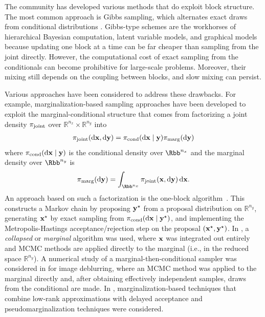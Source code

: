 \documentclass[onefignum,onetabnum]{siamonline250211}
\renewcommand{\d} {{\rm d}}                                %
\newcommand{\bfx}{{\bf x}}
\newcommand{\bfy}{{\bf y}}
\newcommand{\bbR}{\mathbb{R}}
\newcommand{\nx}{{n_{x}}}
\newcommand{\ny}{{n_{y}}}
\newcommand{\pjoint}{\pi_{\rm joint}}
\newcommand{\pcond}{\pi_{\rm cond}}
\newcommand{\pmarg}{\pi_{\rm marg}}
\begin{document}
The community has developed various methods that do exploit block structure.
The most common approach is Gibbs sampling, which alternates exact draws from conditional distributions \cite{geman_stochastic_1984,gelfand_sampling-based_1990,gelman_bayesian_2013}.
Gibbs-type schemes are the workhorses of hierarchical Bayesian computation, latent variable models, and graphical models because updating one block at a time can be far cheaper than sampling from the joint directly.
However, the computational cost of exact sampling from the conditionals can become prohibitive for large-scale problems.
%
Moreover, their mixing still depends on the coupling between blocks, and slow mixing can persist.
%

Various approaches have been considered to address these drawbacks.
For example, marginalization-based sampling approaches have been developed to exploit the marginal-conditional structure that comes from factorizing a joint density $\pjoint$ over $\bbR^\nx \times \bbR^\ny$ into
	\begin{align}\label{eq:joint_factorization}
		\pjoint(\d \bfx, \d \bfy) = \pcond(\d \bfx \mid \bfy) \pmarg(\d \bfy)
	\end{align}
where $\pcond(\d \bfx \mid \bfy)$ is the conditional density over $\Rbb^\nx$ and the marginal density over $\Rbb^\ny$ is
	\begin{align}
    \label{eq:marginal_y}
		\pmarg(\d \bfy) = \int_{\Rbb^\nx} \pjoint(\bfx, \d\bfy)\, \d\bfx.
	\end{align}
%
%
An approach based on such a factorization is the one-block algorithm~\cite{rue_gaussian_2005}. 
%
This constructs a Markov chain by proposing $\bfy^\star$ from a proposal distribution on $\bbR^\ny$, generating $\bfx^\star$ by exact sampling from $\pcond(\d\bfx\mid\bfy^\star)$, and implementing the Metropolis-Hastings acceptance/rejection step on the proposal  $(\bfx^\star,\bfy^\star)$.
In \cite{van_dyk_marginal_2010,papaspiliopoulos_retrospective_2008,liu_collapsed_1994,rue_gaussian_2005}, a \emph{collapsed} or \emph{marginal} algorithm was used, where $\bfx$ was integrated out entirely and MCMC methods are applied directly to the marginal (i.e., in the reduced space $\bbR^{\ny}$).
%
%
A numerical study of a marginal-then-conditional sampler was considered in \cite{fox_fast_2016} for image deblurring, where an MCMC method was applied to the marginal directly and, after obtaining effectively independent samples, draws from the conditional are made.
In \cite{saibaba_efficient_2019}, marginalization-based techniques that combine low-rank approximations with delayed acceptance and pseudomarginalization techniques were considered.
\end{document}
